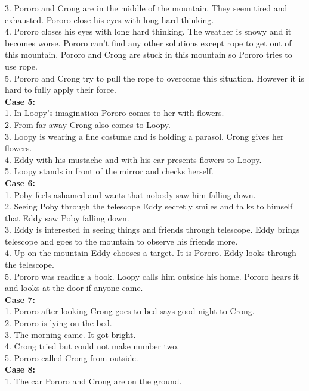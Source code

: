 \documentclass[10pt,twocolumn,letterpaper]{article}
\begin{document}
{{3. Pororo and Crong are in the middle of the mountain. They seem tired and exhausted. Pororo close his eyes with long hard thinking.\\
4. Pororo closes his eyes with long hard thinking. The weather is snowy and it becomes worse. Pororo can't find any other solutions except rope to get out of this mountain. Pororo and Crong are stuck in this mountain so Pororo tries to use rope.\\
5. Pororo and Crong try to pull the rope to overcome this situation. However it is hard to fully apply their force.\\
\textbf{Case 5:}\\
1. In Loopy's imagination Pororo comes to her with flowers.\\
2. From far away Crong also comes to Loopy.\\
3. Loopy is wearing a fine costume and is holding a parasol. Crong gives her flowers.\\
4. Eddy with his mustache and with his car presents flowers to Loopy.\\
5. Loopy stands in front of the mirror and checks herself.\\
\textbf{Case 6:}\\
1. Poby feels ashamed and wants that nobody saw him falling down.\\
2. Seeing Poby through the telescope Eddy secretly smiles and talks to himself that Eddy saw Poby falling down.\\
3. Eddy is interested in seeing things and friends through telescope. Eddy brings telescope and goes to the mountain to observe his friends more.\\
4. Up on the mountain Eddy chooses a target. It is Pororo. Eddy looks through the telescope.\\
5. Pororo was reading a book. Loopy calls him outside his home. Pororo hears it and looks at the door if anyone came.\\
\textbf{Case 7:}\\
1. Pororo after looking Crong goes to bed says good night to Crong.\\
2. Pororo is lying on the bed.\\
3. The morning came. It got bright.\\
4. Crong tried but could not make number two.\\
5. Pororo called Crong from outside.\\
\textbf{Case 8:}\\
1. The car Pororo and Crong are on the ground.\\
}}
\end{document}
